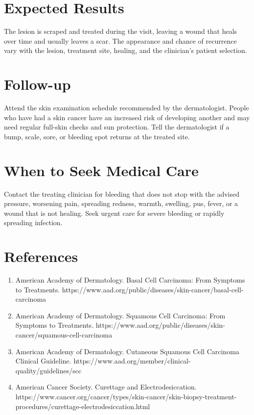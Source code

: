 \section*{Expected Results}
The lesion is scraped and treated during the visit, leaving a wound that heals over time and usually leaves a scar. The appearance and chance of recurrence vary with the lesion, treatment site, healing, and the clinician's patient selection.

\section*{Follow-up}
Attend the skin examination schedule recommended by the dermatologist. People who have had a skin cancer have an increased risk of developing another and may need regular full-skin checks and sun protection. Tell the dermatologist if a bump, scale, sore, or bleeding spot returns at the treated site.

\section*{When to Seek Medical Care}
Contact the treating clinician for bleeding that does not stop with the advised pressure, worsening pain, spreading redness, warmth, swelling, pus, fever, or a wound that is not healing. Seek urgent care for severe bleeding or rapidly spreading infection.

\section*{References}
\begin{enumerate}
  \item American Academy of Dermatology. Basal Cell Carcinoma: From Symptoms to Treatments. https://www.aad.org/public/diseases/skin-cancer/basal-cell-carcinoma
  \item American Academy of Dermatology. Squamous Cell Carcinoma: From Symptoms to Treatments. https://www.aad.org/public/diseases/skin-cancer/squamous-cell-carcinoma
  \item American Academy of Dermatology. Cutaneous Squamous Cell Carcinoma Clinical Guideline. https://www.aad.org/member/clinical-quality/guidelines/scc
  \item American Cancer Society. Curettage and Electrodesiccation. https://www.cancer.org/cancer/types/skin-cancer/skin-biopsy-treatment-procedures/curettage-electrodesiccation.html
\end{enumerate}

\clearpage
